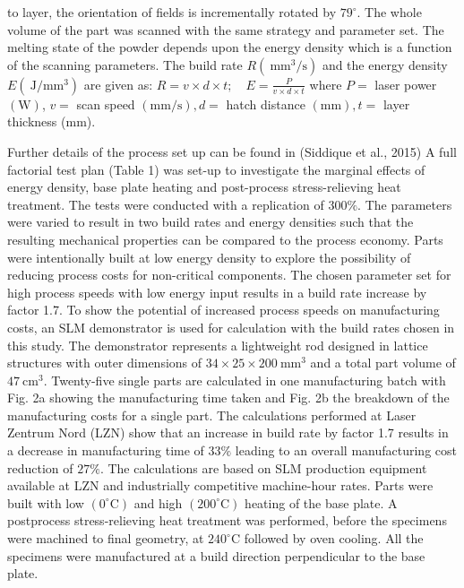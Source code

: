 \documentclass[10pt]{article}
\begin{document}
to layer, the orientation of fields is incrementally rotated by $79^{\circ}$. The whole volume of the part was scanned with the same strategy and parameter set. The melting state of the powder depends upon the energy density which is a function of the scanning parameters. The build rate $R\left(\mathrm{~mm}^{3} / \mathrm{s}\right)$ and the energy density $E\left(\mathrm{~J} / \mathrm{mm}^{3}\right)$ are given as: $R=v \times d \times t ; \quad E=\frac{P}{v \times d \times t}$ where $P=$ laser power $(\mathrm{W})$, $v=$ scan speed $(\mathrm{mm} / \mathrm{s}), d=$ hatch distance $(\mathrm{mm}), t=$ layer thickness (mm).

Further details of the process set up can be found in (Siddique et al., 2015) A full factorial test plan (Table 1) was set-up to investigate the marginal effects of energy density, base plate heating and post-process stress-relieving heat treatment. The tests were conducted with a replication of $300 \%$. The parameters were varied to result in two build rates and energy densities such that the resulting mechanical properties can be compared to the process economy. Parts were intentionally built at low energy density to explore the possibility of reducing process costs for non-critical components. The chosen parameter set for high process speeds with low energy input results in a build rate increase by factor 1.7. To show the potential of increased process speeds on manufacturing costs, an SLM demonstrator is used for calculation with the build rates chosen in this study. The demonstrator represents a lightweight rod designed in lattice structures with outer dimensions of $34 \times 25 \times 200 \mathrm{~mm}^{3}$ and a total part volume of $47 \mathrm{~cm}^{3}$. Twenty-five single parts are calculated in one manufacturing batch with Fig. 2a showing the manufacturing time taken and Fig. 2b the breakdown of the manufacturing costs for a single part. The calculations performed at Laser Zentrum Nord (LZN) show that an increase in build rate by factor 1.7 results in a decrease in manufacturing time of $33 \%$ leading to an overall manufacturing cost reduction of $27 \%$. The calculations are based on SLM production equipment available at LZN and industrially competitive machine-hour rates. Parts were built with low $\left(0^{\circ} \mathrm{C}\right)$ and high $\left(200^{\circ} \mathrm{C}\right)$ heating of the base plate. A postprocess stress-relieving heat treatment was performed, before the specimens were machined to final geometry, at $240^{\circ} \mathrm{C}$ followed by oven cooling. All the specimens were manufactured at a build direction perpendicular to the base plate.
\end{document}
